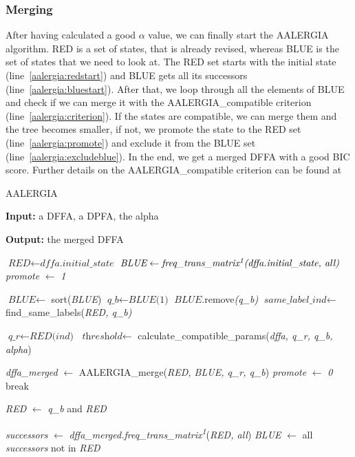\documentclass[
a4paper,
12pt
]{scrartcl}
\begin{document}
\subsubsection{Merging }

After having calculated a good $\alpha$ value, we can finally start the AALERGIA algorithm. RED is a set of states, that is already revised, whereas BLUE is the set of states that we need to look at. The RED set starts with the initial state (line~\ref{aalergia:redstart}) and BLUE gets all its successors (line~\ref{aalergia:bluestart}). After that, we loop through all the elements of BLUE and check if we can merge it with the AALERGIA\_compatible criterion (line~\ref{aalergia:criterion}). If the states are compatible, we can merge them and the tree becomes smaller, if not, we promote the state to the RED set (line~\ref{aalergia:promote}) and exclude it from the BLUE set (line~\ref{aalergia:excludeblue}). In the end, we get a merged DFFA with a good BIC score. Further details on the AALERGIA\_compatible criterion can be found at \cite{Mao.}

\begin{algorithm}[H]
\caption{AALERGIA}\label{alg:aalergia}
\begin{algorithmic}[1]
\item \textbf{Input:}  a DFFA, a DPFA, the alpha
\item \textbf{Output:} the merged DFFA

\State $\textit{RED} \gets \textit{dffa.initial\_state}$ \label{aalergia:redstart}
\State $\textit{BLUE} \gets \textit{freq\_trans\_matrix\textsuperscript{1}(dffa.initial\_state, all)}$ \label{aalergia:bluestart}
\State \textit{promote} $\gets$ \textit{1}


 \State $\textit{BLUE} \gets$ sort(\textit{BLUE})
 \State $\textit{q\_b} \gets \textit{BLUE(1)}$
 \State $\textit{BLUE}$.remove\textit{(q\_b)}
 \State $\textit{same\_label\_ind} \gets $find\_same\_labels(\textit{RED, q\_b)}

        \State $\textit{q\_r} \gets \textit{RED(ind)}$
        \State $\textit{threshold} \gets$ calculate\_compatible\_params(\textit{dffa, q\_r, q\_b, alpha})

         \label{aalergia:criterion}
          \State \textit{dffa\_merged} $\gets$ AALERGIA\_merge(\textit{RED, BLUE, q\_r, q\_b})
          \State \textit{promote} $\gets$ \textit{0}
          \State break
        \EndIf
\EndFor

          \State \textit{RED} $\gets$ \textit{q\_b} and \textit{RED} \label{aalergia:promote}
        \EndIf

    \State \textit{successors} $\gets$ \textit{dffa\_merged.freq\_trans\_matrix\textsuperscript{1}}(\textit{RED, all})
    \State \textit{BLUE} $\gets$ all \textit{successors} not in \textit{RED} \label{aalergia:excludeblue}
  \EndWhile
\end{algorithmic}
\end{algorithm}
\end{document}

